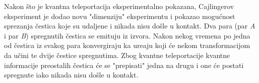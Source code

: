 Nakon \v sto je kvantna teleportacija eksperimentalno pokazana, Cajlingerov eksperiment je dodao novu "dimenziju" eksperimentu i pokazao
mogu\' cnost sprezanja \v cestica koje su udaljene i nikada nisu do\v sle u kontakt.
Dva para (par \textit{A} i par \textit{B}) spregnutih \v cestica se emituju iz izvora. Nakon nekog vremena po jedna od \v cestica iz svakog para konvergiraju ka
ure\dj aju koji \' ce nekom transformacijom da u\v cini te dvije \v cestice spregnutima. Zbog kvantne teleportacije kvantne informacije preostalih
\v cestica \' ce se "prepisati" jedna na drugu i one \'ce postati spregnute iako nikada nisu do\v sle u kontakt.

